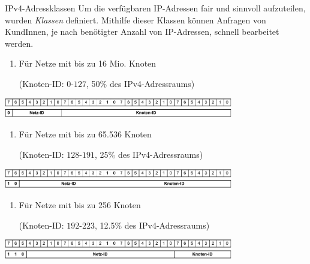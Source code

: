 \begin{defi}{IPv4-Adressklassen}
    Um die verfügbaren IP-Adressen fair und sinnvoll aufzuteilen, wurden \emph{Klassen} definiert.
    Mithilfe dieser Klassen können Anfragen von KundInnen, je nach benötigter Anzahl von IP-Adressen, schnell bearbeitet werden.
    
    \begin{enumerate}[label=Klasse \Alph*:, leftmargin=*]
        \item Für Netze mit bis zu 16 Mio. Knoten
              
              (Knoten-ID: $0\text{-}127$, 50\% des IPv4-Adressraums)
    \end{enumerate}
    
    \begin{center}
        \includegraphics[width=0.75\textwidth]{includes/figures/bonus_class_a.pdf}
    \end{center}
    
    \begin{enumerate}[label=Klasse \Alph*:, leftmargin=*, start=2]
        \item Für Netze mit bis zu 65.536 Knoten
              
              (Knoten-ID: $128\text{-}191$, 25\% des IPv4-Adressraums)
    \end{enumerate}
    
    \begin{center}
        \includegraphics[width=0.75\textwidth]{includes/figures/bonus_class_b.pdf}
    \end{center}
    
    \begin{enumerate}[label=Klasse \Alph*:, leftmargin=*, start=3]
        \item Für Netze mit bis zu 256 Knoten
              
              (Knoten-ID: $192\text{-}223$, 12.5\% des IPv4-Adressraums)
    \end{enumerate}
    
    \begin{center}
        \includegraphics[width=0.75\textwidth]{includes/figures/bonus_class_c.pdf}
    \end{center}
    

\end{defi}
